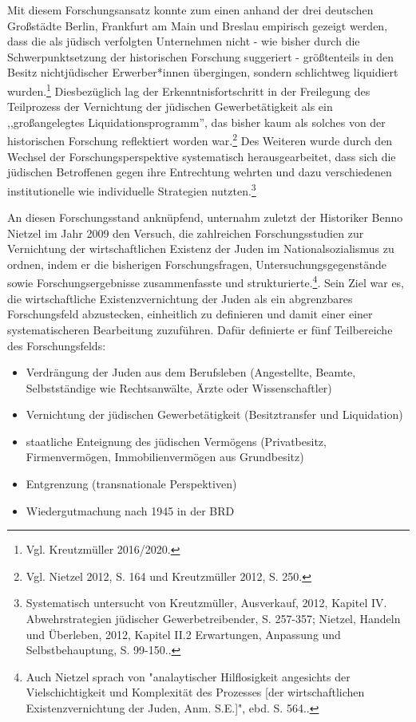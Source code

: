 Mit diesem Forschungsansatz konnte zum einen anhand der drei deutschen Großstädte Berlin, Frankfurt am Main und Breslau empirisch  gezeigt werden, dass die als jüdisch verfolgten Unternehmen nicht - wie bisher durch die Schwerpunktsetzung der historischen Forschung suggeriert - größtenteils in den Besitz nichtjüdischer Erwerber*innen übergingen, sondern schlichtweg liquidiert wurden.\footnote{Vgl. Kreutzmüller 2016/2020.} Diesbezüglich lag der Erkenntnisfortschritt in der Freilegung des Teilprozess der Vernichtung der jüdischen Gewerbetätigkeit als ein ,,großangelegtes Liquidationsprogramm'', das bisher kaum als solches von der historischen Forschung reflektiert worden war.\footnote{Vgl. Nietzel 2012, S. 164 und Kreutzmüller 2012, S. 250.} Des Weiteren wurde durch den Wechsel der Forschungsperspektive systematisch herausgearbeitet, dass sich die jüdischen Betroffenen gegen ihre Entrechtung wehrten und dazu verschiedenen institutionelle wie individuelle Strategien nutzten.\footnote{Systematisch untersucht von Kreutzmüller, Ausverkauf, 2012, Kapitel IV. Abwehrstrategien jüdischer Gewerbetreibender, S. 257-357; Nietzel, Handeln und Überleben, 2012, Kapitel II.2 Erwartungen, Anpassung und Selbstbehauptung, S. 99-150..}

An diesen Forschungsstand anknüpfend, unternahm zuletzt der Historiker Benno Nietzel im Jahr 2009 den Versuch, die zahlreichen Forschungsstudien zur Vernichtung der wirtschaftlichen Existenz der Juden im Nationalsozialismus zu ordnen, indem er die bisherigen Forschungsfragen, Untersuchungsgegenstände sowie Forschungsergebnisse zusammenfasste und strukturierte.\footnote{Auch Nietzel sprach von "analaytischer Hilflosigkeit angesichts der Vielschichtigkeit und Komplexität des Prozesses [der wirtschaftlichen Existenzvernichtung der Juden, Anm. S.E.]", ebd. S. 564..}. Sein Ziel war es, die wirtschaftliche Existenzvernichtung der Juden als ein abgrenzbares Forschungsfeld abzustecken, einheitlich zu definieren und damit einer einer systematischeren Bearbeitung zuzuführen. Dafür definierte er fünf Teilbereiche des Forschungsfelds:
\begin{itemize}
\item Verdrängung der Juden aus dem Berufsleben (Angestellte, Beamte, Selbstständige wie Rechtsanwälte, Ärzte oder Wissenschaftler)
\item Vernichtung der jüdischen Gewerbetätigkeit (Besitztransfer und Liquidation)
\item staatliche Enteignung des jüdischen Vermögens (Privatbesitz, Firmenvermögen, Immobilienvermögen aus Grundbesitz) 
\item Entgrenzung (transnationale Perspektiven)
\item Wiedergutmachung nach 1945 in der BRD
\end{itemize}

